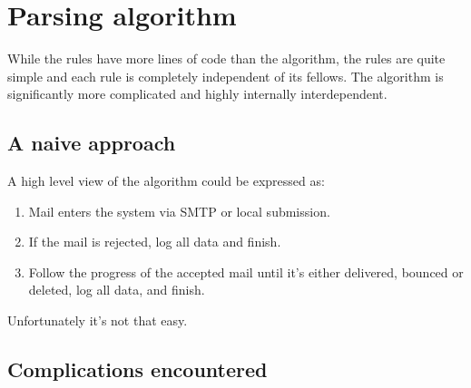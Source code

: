 \documentclass[a4paper,12pt,draft]{article}
\begin{document}
\section{Parsing algorithm}

\label{parsing-algorithm}

While the rules have more lines of code than the algorithm, the rules are
quite simple and each rule is completely independent of its fellows.  The
algorithm is significantly more complicated and highly internally
interdependent.


\subsection{A naive approach}

A high level view of the algorithm could be expressed as:

\begin{enumerate}

    \item Mail enters the system via SMTP or local submission.

    \item If the mail is rejected, log all data and finish.

    \item Follow the progress of the accepted mail until it's either
        delivered, bounced or deleted, log all data, and finish.

\end{enumerate}

Unfortunately it's not that easy.


\subsection{Complications encountered}

\label{complications}
\end{document}
